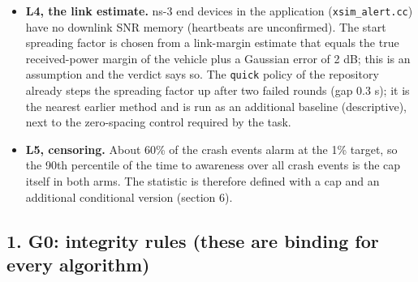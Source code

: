 \begin{itemize}
\item \textbf{L4, the link estimate.} ns-3 end devices in the application (\texttt{xsim\_alert.cc}) have no downlink SNR memory (heartbeats are unconfirmed). The start spreading factor is chosen from a link-margin estimate that equals the true received-power margin of the vehicle plus a Gaussian error of 2 dB; this is an assumption and the verdict says so. The \texttt{quick} policy of the repository already steps the spreading factor up after two failed rounds (gap 0.3 s); it is the nearest earlier method and is run as an additional baseline (descriptive), next to the zero-spacing control required by the task.
\item \textbf{L5, censoring.} About 60\% of the crash events alarm at the 1\% target, so the 90th percentile of the time to awareness over all crash events is the cap itself in both arms. The statistic is therefore defined with a cap and an additional conditional version (section 6).
\end{itemize}

\subsection*{1. G0: integrity rules (these are binding for every algorithm)}

